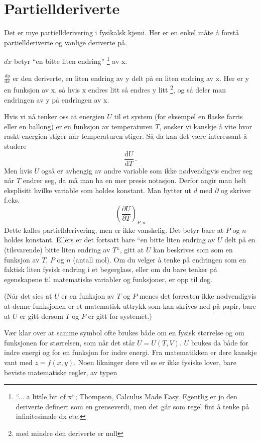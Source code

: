 \documentclass[11pt, A4paper]{article}
\begin{document}
\section{Partiellderiverte}
Det er mye partiellderivering i fysikalsk kjemi. Her er en enkel måte å forstå partiellderiverte og vanlige deriverte på. 

$dx$ betyr ``en bitte liten endring'' \footnote{``... a little bit of x``; Thompson, Calculus Made Easy. Egentlig er jo den deriverte definert som en grenseverdi, men det går som regel fint å tenke på infinitesimale dx etc.} av x.

$\frac{dy}{dx}$ er den deriverte, en liten endring av y delt på en
liten endring av x. Her er y en funksjon av x, så hvis x endres
litt så endres y litt \footnote{med mindre den deriverte er null}, og så deler man endringen av y på endringen av x. 

Hvis vi nå tenker oss at energien $U$ til et system (for eksempel en flaske farris
eller en ballong) er en funksjon av temperaturen $T$, ønsker vi kanskje å vite
hvor raskt energien stiger når temperaturen stiger. Så da kan
det være interessant å studere
\begin{equation*}
\label{eq:16}
\frac{\mathrm{d}U}{\mathrm{d}T}\,.
\end{equation*}
Men hvis $U$ også er avhengig av andre variable som ikke nødvendigvis endrer seg når $T$ endrer seg, da må man ha en mer presis notasjon. Derfor  angir man helt
eksplisitt hvilke variable som holdes konstant. Man bytter ut $d$ med
$\partial$ og skriver f.eks.
\begin{equation*}
\label{eq:1}
\left(\frac{\partial U}{\partial T}\right)_{P,n}
\end{equation*}
Dette kalles partiellderivering, men er ikke vanskelig. Det betyr bare at $P$ og $n$ holdes konstant. Ellers er det fortsatt bare
``en bitte liten endring av $U$ delt på en (tilsvarende) bitte liten
endring av $T$``, gitt at $U$ kan beskrives som som en funksjon av
$T$, $P$ og $n$ (antall mol). Om du velger å tenke på endringen som en
faktisk liten fysisk endring i et begerglass, eller om du bare tenker
på egenskapene til matematiske variabler og funksjoner, er opp til
deg.

(Når det sies at $U$ er en funksjon av $T$ og $P$
menes det forresten ikke nødvendigvis at denne funksjonen er et matematisk uttrykk
som kan skrives ned på papir, bare at $U$ er gitt dersom $T$ og $P$
er gitt for systemet.)

Vær klar over at samme symbol ofte brukes både om en fysisk størrelse
og om funksjonen for størrelsen, som når det står $U = U(T, V)$. $U$
brukes da både for indre energi og for en funksjon for indre
energi. Fra matematikken er dere kanskje vant med $z = f(x, y)$. Noen
likninger dere vil se er ikke fysiske lover, bare beviste matematiske
regler, av typen
\end{document}
